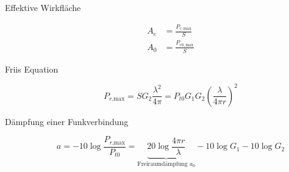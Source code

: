 \begin{description}
\item[Effektive Wirkfläche]
\begin{align*}
A_e &= \frac{P_{r,\text{max}}}{S} \\
A_0 &= \frac{P_{r0,\text{max}}}{S}
\end{align*}

\item[Friis Equation]
\begin{equation*}
P_{r\text{,max}} = S G_2 \frac{\lambda^2}{4 \pi} = P_{t0} G_1 G_2 \left( \frac{\lambda}{4\pi r} \right)^2
\end{equation*}

\item[Dämpfung einer Funkverbindung]
\begin{equation*}
a = -10 \log{\frac{P_{r\text{,max}}}{P_{t0}}} = \underbrace{20\log{\frac{4\pi r}{\lambda}}}_{\text{Freiraumdämpfung } a_0} - 10\log{G_1} - 10\log{G_2}
\end{equation*}
\end{description}